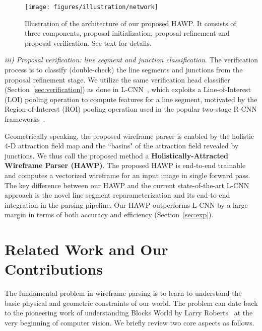 \documentclass[10pt,twocolumn,letterpaper]{article}
\begin{document}
\begin{figure}
    \centering
    \texttt{[image: figures/illustration/network]}
    \caption{Illustration of the architecture of our proposed HAWP. It consists of three components, proposal initialization, proposal refinement and proposal verification. See text for details.}
    \label{fig:network}
\end{figure}

\textit{iii) Proposal verification: line segment and junction classification}. The verification process is to classify (double-check) the line segments and junctions from the proposal refinement stage. We utilize the same verification head classifier (Section~\ref{sec:verification}) as done in  L-CNN~\cite{ZhouQM19}, which exploits a Line-of-Interest (LOI) pooling operation to compute features for a line segment, motivated by the Region-of-Interest (ROI) pooling operation used in the popular two-stage R-CNN frameworks~\cite{fastRCNN,fasterrcnn,maskrcnn}.        

Geometrically speaking, the proposed wireframe parser is enabled by the holistic 4-D attraction field map and the ``basins" of the attraction field revealed by junctions. We thus call the proposed method a \textbf{Holistically-Attracted Wireframe Parser (HAWP)}.
The proposed HAWP is end-to-end trainable and computes a vectorized wireframe for an input image in single forward pass. The key difference between our HAWP and the current state-of-the-art L-CNN~\cite{ZhouQM19} approach is the novel line segment reparameterization and its end-to-end integration in the parsing pipeline. Our HAWP outperforms L-CNN by a large margin in terms of both accuracy and efficiency (Section~\ref{sec:exp}).


\section{Related Work and Our Contributions}
\vspace{-2mm}
The fundamental problem in wireframe parsing is to learn to understand the basic physical and geometric constraints of our world. The problem can date back to the pioneering work of understanding Blocks World by Larry Roberts~\cite{roberts1963machine,GuptaEH10} at the very beginning of computer vision. We briefly review two core aspects as follows.
\end{document}
